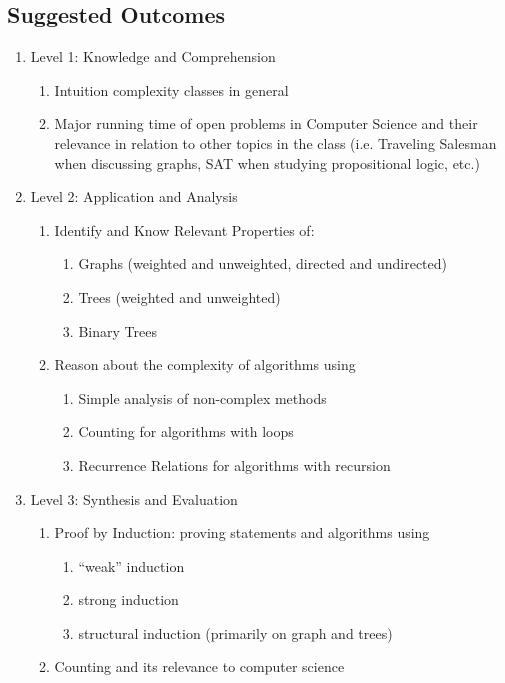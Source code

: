 \documentclass[11pt]{article}
\begin{document}
\begin{appendix}
\section{Suggested Outcomes}
\label{app:newOutcomes}
\begin{enumerate}
\item Level 1: Knowledge and Comprehension 
	\begin{enumerate}
	\item	Intuition complexity classes in general
	\item Major running time of open problems in Computer Science and their relevance in relation to other topics in the class (i.e. Traveling Salesman when discussing graphs, SAT when studying propositional logic, etc.) 
	\end{enumerate}
\item Level 2: Application and Analysis 
	\begin{enumerate}
	\item Identify and Know Relevant Properties of:
		\begin{enumerate}
		\item Graphs (weighted and unweighted, directed and undirected)
		\item Trees (weighted and unweighted)
		\item Binary Trees
		\end{enumerate}
	\item Reason about the complexity of algorithms using
		\begin{enumerate}
		\item Simple analysis of non-complex methods
		\item Counting for algorithms with loops
		\item Recurrence Relations for algorithms with recursion
		\end{enumerate}
	\end{enumerate}
\item Level 3: Synthesis and Evaluation 
	\begin{enumerate}
	\item Proof by Induction: proving statements and algorithms using
		\begin{enumerate}
		\item “weak” induction
		\item strong induction
		\item structural induction (primarily on graph and trees)
		\end{enumerate}
	\item Counting and its relevance to computer science 
	\end{enumerate}
\end{enumerate}


\end{appendix}
\end{document}

